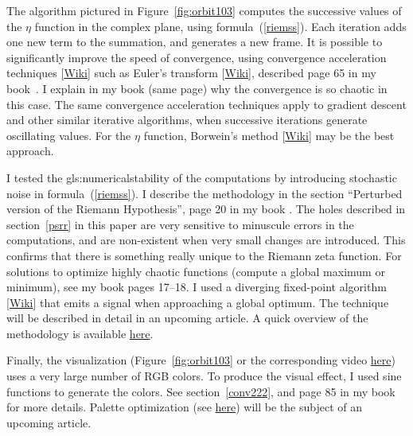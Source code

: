 \documentclass[oneside,10pt]{book}
\begin{document}
The algorithm pictured in Figure~\ref{fig:orbit103} computes the successive values of the $\eta$ function in the complex plane, using
formula~(\ref{riemss}). Each iteration adds one new term to the summation, and generates a new frame. It is possible to
significantly improve the speed of convergence, using \textcolor{index}{convergence acceleration} techniques 
[\href{https://en.wikipedia.org/wiki/Series_acceleration}{Wiki}] such as Euler's transform [\href{https://mathworld.wolfram.com/EulerTransform.html}{Wiki}], described page 65 in my book~\cite{vgsimulnew}. I explain in my book (same page)
 why the convergence is so chaotic in this case. The same convergence acceleration techniques apply to gradient descent
 and other similar iterative algorithms, when successive iterations generate oscillating values. For the $\eta$ function, 
 Borwein’s method [\href{https://en.wikipedia.org/wiki/Borwein\%27s_algorithm}{Wiki}] may be the best approach.

I tested the \gls{gls:numericalstability} of the computations by introducing stochastic noise in formula~(\ref{riemss}). I describe the methodology in
 the section ``Perturbed version of the Riemann Hypothesis'', page 20 in my book \cite{vgsimulnew}. The holes described in section~\ref{psrr} in this paper are very sensitive to minuscule errors in the computations, and are non-existent when very small changes are introduced. This confirms that there is something really unique to the Riemann zeta function. For solutions to optimize  highly chaotic functions (compute a global maximum or minimum), see my book \cite{vgsimulnew} pages 17--18. I used a diverging
 \textcolor{index}{fixed-point algorithm} [\href{https://en.wikipedia.org/wiki/Fixed-point_iteration}{Wiki}] that emits a signal when approaching a global optimum. 
The technique will be described in detail in an upcoming article. A quick overview of the methodology is available \href{https://www.datasciencecentral.com/a-new-machine-learning-optimization-technique-part-i/}{here}.

Finally, the visualization (Figure~\ref{fig:orbit103} or the corresponding video \href{https://www.youtube.com/watch?v=XI5MhyNc7us}{here}) uses a very large number of RGB colors. To produce the visual effect, I used sine functions to generate the colors. See section~\ref{conv222}, and page 85 in my book~\cite{vgsimulnew} for more details.
Palette optimization (see \href{https://mathoverflow.net/questions/415618/lattice-like-structure-with-maximum-spacing-between-vertices}{here}) will be the subject of an upcoming article.
\end{document}

